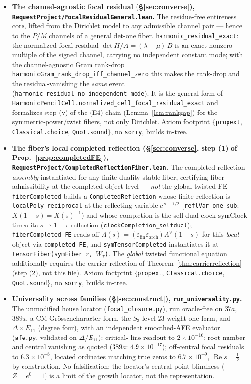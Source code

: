 \documentclass[11pt]{article}
\theoremstyle{definition}
\renewcommand{\Re}{\operatorname{Re}}
\begin{document}
\begin{itemize}
\item \textbf{The channel-agnostic focal residual (\S\ref{sec:converse}),
\texttt{RequestProject/FocalResidualGeneral.lean}.} The residue-free entireness core, lifted from the
Dirichlet model to any admissible channel pair --- hence to the $P/M$ channels of a general det-one fiber.
\texttt{harmonic\_residual\_exact}: the normalized focal residual $\det H/A=(\lambda-\mu)\,B$ is an exact
nonzero multiple of the signed channel, carrying no independent constant mode; with the channel-agnostic Gram
rank-drop \texttt{harmonicGram\_rank\_drop\_iff\_channel\_zero} this makes the rank-drop and the
residual-vanishing the \emph{same} event (\texttt{harmonic\_residual\_no\_independent\_mode}). It is the
general form of \texttt{HarmonicPencilCell.normalized\_cell\_focal\_residual\_exact} and formalizes step
\textup{(v)} of the \textup{(E4)} chain (Lemma~\ref{lem:rankgap}) for the symmetric-power/twist fibers, not
only Dirichlet. Axiom footprint $\{$\texttt{propext}, \texttt{Classical.choice}, \texttt{Quot.sound}$\}$, no
\texttt{sorry}, builds in-tree.

\item \textbf{The fiber's local completed reflection (\S\ref{sec:converse}, step (1) of
Prop.~\ref{prop:completedFE}), \texttt{RequestProject/CompletedReflectionFiber.lean}.} The completed-reflection
\emph{assembly} instantiated for any finite duality-stable fiber, certifying fiber admissibility at the
completed-object level --- \emph{not} the global twisted FE. \texttt{fiberCompleted} builds a
\texttt{CompletedReflection} whose finite reflection is \texttt{localPoly\_reciprocal} at the reflecting
variable $c^{\,s-1/2}$ (\texttt{reflVar\_one\_sub}: $X(1-s)=X(s)^{-1}$) and whose completion is the self-dual
clock $\mathrm{symClock}$ times its $s\mapsto1-s$ reflection (\texttt{clockCompletion\_selfdual});
\texttt{fiberCompleted\_FE} reads off $\Lambda(s)=(\varepsilon_{\mathrm{fin}}\varepsilon_{\mathrm{arch}})\Lambda^\vee(1-s)$
for this \emph{local} object via \texttt{completed\_FE}, and \texttt{symTensorCompleted} instantiates it at
\texttt{tensorFiber(symFiber\,$r$,\,$W_\tau$)}. The \emph{global} twisted functional equation additionally
requires the carrier reflection of Theorem~\ref{thm:carrierreflection} (step (2), not this file). Axiom
footprint $\{$\texttt{propext}, \texttt{Classical.choice}, \texttt{Quot.sound}$\}$, no \texttt{sorry}, builds
in-tree.

\item \textbf{Universality across families (\S\ref{sec:construct}), \texttt{run\_universality.py}.}
The unmodified house locator (\texttt{focal\_closure.py}), run oracle-free on $37a$, $389a$, a CM
Gr\"ossencharacter form, the $S_3$ level-$23$ weight-one form, and $\Delta\times E_{11}$ (degree four),
with an independent smoothed-AFE evaluator (\texttt{afe.py}, validated on $\Delta$/$E_{11}$): critical-
line readout to $2\times10^{-16}$; root number and central vanishing as quoted
($389a$: $4.9\times10^{-17}$); off-central focal residuals to $6.3\times10^{-8}$, located ordinates
matching true zeros to $6.7\times10^{-9}$, $\Re s=\tfrac12$ by construction. No falsification; the
locator's central-point blindness ($Z=e^{0}=1$) is a limit of the growth locator, not the
representation.


\end{itemize}
\end{document}
